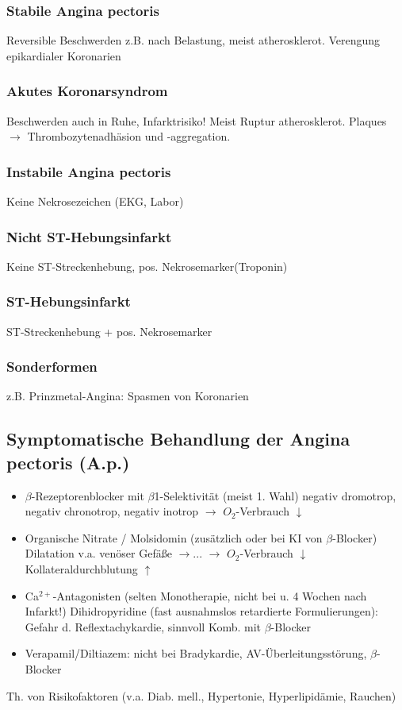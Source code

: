 \documentclass[10pt,a4paper]{report}
\begin{document}
\subsubsection{Stabile Angina pectoris} Reversible Beschwerden z.B. nach Belastung, meist atherosklerot. Verengung epikardialer Koronarien
\subsubsection{Akutes Koronarsyndrom}Beschwerden auch in Ruhe, Infarktrisiko! Meist Ruptur atherosklerot. Plaques $\rightarrow$ Thrombozytenadhäsion und -aggregation.

\subsubsection{Instabile Angina pectoris} Keine Nekrosezeichen (EKG, Labor)

\subsubsection{Nicht ST-Hebungsinfarkt} Keine ST-Streckenhebung, pos. Nekrosemarker(Troponin)

\subsubsection{ST-Hebungsinfarkt} ST-Streckenhebung + pos. Nekrosemarker

\subsubsection{Sonderformen} z.B. Prinzmetal-Angina: Spasmen von Koronarien
\subsection{Symptomatische Behandlung der Angina pectoris (A.p.)}
\begin{itemize}
	\item $\beta$-Rezeptorenblocker mit $\beta$1-Selektivität (meist 1. Wahl) negativ dromotrop, negativ chronotrop, negativ inotrop $\rightarrow$ $O_2$-Verbrauch $\downarrow$
	\item Organische Nitrate / Molsidomin (zusätzlich oder bei KI von $\beta$-Blocker) Dilatation v.a. venöser Gefäße  $\rightarrow$... $\rightarrow$ $O_2$-Verbrauch $\downarrow$ Kollateraldurchblutung $\uparrow$
	\item Ca$^{2+}$-Antagonisten (selten Monotherapie, nicht bei u. 4 Wochen nach Infarkt!) Dihidropyridine (fast ausnahmslos retardierte Formulierungen): Gefahr d. Reflextachykardie, sinnvoll Komb. mit $\beta$-Blocker 
	\item Verapamil/Diltiazem: nicht bei Bradykardie, AV-Überleitungsstörung, $\beta$-Blocker 
\end{itemize}
Th. von Risikofaktoren (v.a. Diab. mell., Hypertonie, Hyperlipidämie, Rauchen) 
\end{document}
